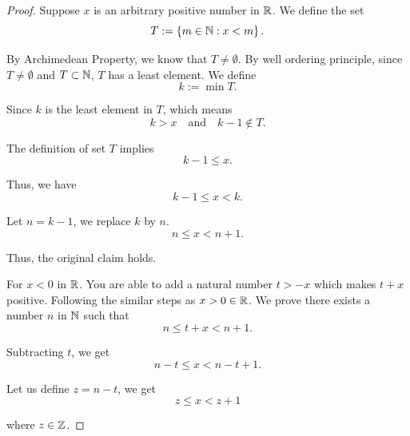\newpage
\subsubsection{}
\begin{proof}
    Suppose $x$ is an arbitrary positive number in $\mathbb{R}$. We define the set 
    \begin{equation*}
        T := \left\{m \in \mathbb{N} : x < m\right\}. 
    \end{equation*}

    By Archimedean Property, we know that $T \neq \emptyset$. By well ordering principle, since $T \neq \emptyset$ and $T \subset \mathbb{N}$, $T$ has a least element. We define 
    \begin{equation*}
        k := \min T. 
    \end{equation*}

    Since $k$ is the least element in $T$, which means 
    \begin{equation*}
        k > x \quad \text{and} \quad k - 1 \not\in T. 
    \end{equation*}

    The definition of set $T$ implies 
    \begin{equation*}
        k - 1 \leq x. 
    \end{equation*}

    Thus, we have 
    \begin{equation*}
        k - 1 \leq x < k. 
    \end{equation*}

    Let $n = k - 1$, we replace $k$ by $n$. 
    \begin{equation*}
        n \leq x < n + 1. 
    \end{equation*}

    Thus, the original claim holds. 

    For $x < 0$ in $\mathbb{R}$. You are able to add a natural number $t > -x$ which makes $t + x$ positive. 
    Following the similar steps as $x > 0 \in \mathbb{R}$. We prove there exists a number $n$ in $\mathbb{N}$ such that 
    \begin{equation*}
        n \leq t + x < n + 1. 
    \end{equation*}

    Subtracting $t$, we get 
    \begin{equation*}
        n - t \leq x < n - t + 1. 
    \end{equation*}

    Let us define $z = n - t$, we get 
    \begin{equation*}
        z \leq x < z + 1
    \end{equation*}

    where $z \in \mathbb{Z}$. 

\end{proof}

